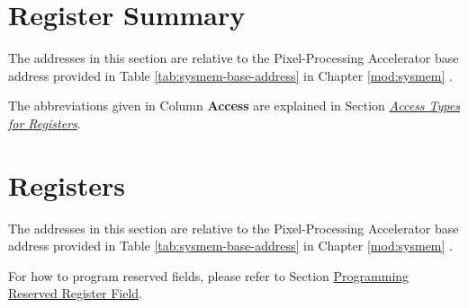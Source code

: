 \documentclass[main\_\_EN.tex]{subfiles}
\begin{document}
\section{Register Summary}
\label{sec:ppa-reg-summ}

The addresses in this section are relative to the Pixel-Processing Accelerator base address provided in Table \ref{tab:sysmem-base-address} in Chapter \ref{mod:sysmem} \textit{}.

The abbreviations given in Column \textbf{Access} are explained in Section \hyperref[glossary-access-types]{\textit{Access Types for Registers}}.






\newpage
\section{Registers}

The addresses in this section are relative to the Pixel-Processing Accelerator base address provided in Table \ref{tab:sysmem-base-address} in Chapter \ref{mod:sysmem} \textit{}.

For how to program reserved fields, please refer to Section \hyperref[programming-reserved-field]{Programming Reserved Register Field}.



\end{document}
